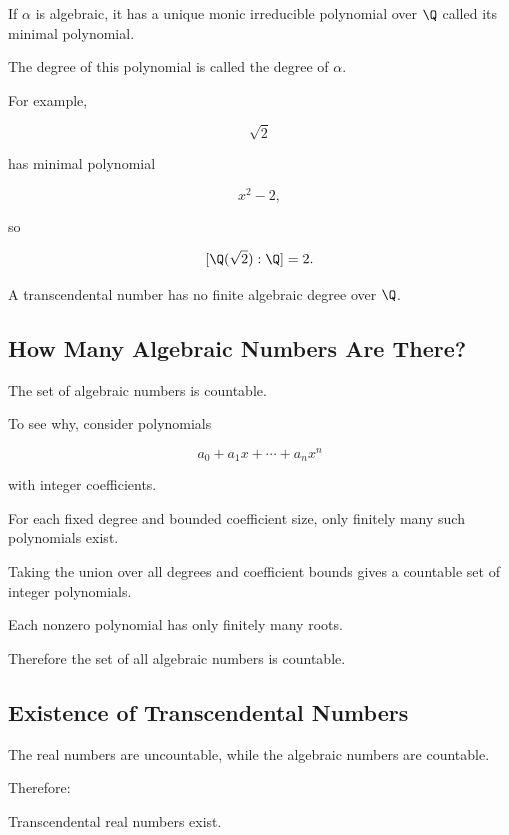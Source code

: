 If \(\alpha\) is algebraic, it has a unique monic irreducible polynomial over
\(\Q\) called its minimal polynomial.

The degree of this polynomial is called the degree of \(\alpha\).

For example,

\[ \sqrt2 \]

has minimal polynomial

\[ x^2-2, \]

so

\[ [\Q(\sqrt2):\Q]=2. \]

A transcendental number has no finite algebraic degree over \(\Q\).

\subsection{How Many Algebraic Numbers Are There?}
\label{subsec:countability-algebraic-numbers}

The set of algebraic numbers is countable.

To see why, consider polynomials

\[ a_0+a_1x+\cdots+a_nx^n \]

with integer coefficients.

For each fixed degree and bounded coefficient size, only finitely many such
polynomials exist.

Taking the union over all degrees and coefficient bounds gives a countable
set of integer polynomials.

Each nonzero polynomial has only finitely many roots.

Therefore the set of all algebraic numbers is countable.

\subsection{Existence of Transcendental Numbers}
\label{subsec:existence-transcendental-numbers}

The real numbers are uncountable, while the algebraic numbers are countable.

Therefore:

\begin{theorem}
Transcendental real numbers exist.
\end{theorem}

